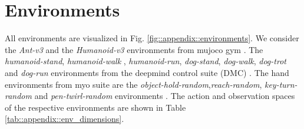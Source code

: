 \section{Environments}\label{apdx::environment_details}


\begin{figure*}[t!]
    \begin{minipage}[b]{1\textwidth}
        \centering
       \resizebox{1\textwidth}{!}{}
    \end{minipage}\hfill
    \caption{\textbf{Considered environments.} The \textit{Humanoid-v3} and the \textit{Ant-v3} are environments from the mujoco gym benchmark \cite{gymopenai}. The three environments\textit{humanoid-run},\textit{humanoid-walk} and \textit{humanoid-stand} are from the deepmind control suite (DMC) benchmark \cite{dmcontrol}. The dog environments consist of \textit{dog-run}, \textit{dog-walk}, \textit{dog-stand}, \textit{dog-trot} and are also from the DMC sutie benchmark. Finally, the myo suite hand environments \textit{object-hold-hard},\textit{reach-hard}, \textit{key-turn-hard}, \textit{pen-twirl-hard} are from the myo suite \cite{MyoSuite2022}.}
       \label{fig::appendix::environments}
\end{figure*}


All environments are visualized in Fig. \ref{fig::appendix::environments}. We consider the \textit{Ant-v3} and the \textit{Humanoid-v3} environments from mujoco gym \cite{gymopenai}. The \textit{humanoid-stand}, \textit{humanoid-walk} , \textit{humanoid-run}, \textit{dog-stand}, \textit{dog-walk}, \textit{dog-trot} and \textit{dog-run} environments from the deepmind control suite (DMC) \cite{dmcontrol}. The hand environments from myo suite are the \textit{object-hold-random},\textit{reach-random}, \textit{key-turn-random} and \textit{pen-twirl-random} environments \cite{MyoSuite2022}. The action and observation spaces of the respective environments are shown in Table \ref{tab::appendix::env_dimensions}.

